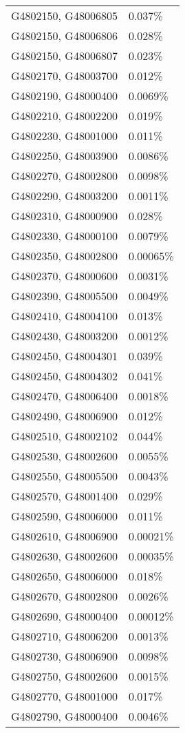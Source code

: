 \begin{longtable}[]{@{}ll@{}}
G4802150, G48006805 & 0.037\% \\
G4802150, G48006806 & 0.028\% \\
G4802150, G48006807 & 0.023\% \\
G4802170, G48003700 & 0.012\% \\
G4802190, G48000400 & 0.0069\% \\
G4802210, G48002200 & 0.019\% \\
G4802230, G48001000 & 0.011\% \\
G4802250, G48003900 & 0.0086\% \\
G4802270, G48002800 & 0.0098\% \\
G4802290, G48003200 & 0.0011\% \\
G4802310, G48000900 & 0.028\% \\
G4802330, G48000100 & 0.0079\% \\
G4802350, G48002800 & 0.00065\% \\
G4802370, G48000600 & 0.0031\% \\
G4802390, G48005500 & 0.0049\% \\
G4802410, G48004100 & 0.013\% \\
G4802430, G48003200 & 0.0012\% \\
G4802450, G48004301 & 0.039\% \\
G4802450, G48004302 & 0.041\% \\
G4802470, G48006400 & 0.0018\% \\
G4802490, G48006900 & 0.012\% \\
G4802510, G48002102 & 0.044\% \\
G4802530, G48002600 & 0.0055\% \\
G4802550, G48005500 & 0.0043\% \\
G4802570, G48001400 & 0.029\% \\
G4802590, G48006000 & 0.011\% \\
G4802610, G48006900 & 0.00021\% \\
G4802630, G48002600 & 0.00035\% \\
G4802650, G48006000 & 0.018\% \\
G4802670, G48002800 & 0.0026\% \\
G4802690, G48000400 & 0.00012\% \\
G4802710, G48006200 & 0.0013\% \\
G4802730, G48006900 & 0.0098\% \\
G4802750, G48002600 & 0.0015\% \\
G4802770, G48001000 & 0.017\% \\
G4802790, G48000400 & 0.0046\% \\

\end{longtable}
